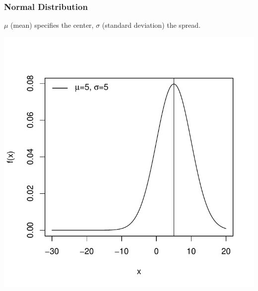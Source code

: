 \documentclass[slides]{beamer}
\begin{document}
\begin{frame}
\frametitle{Normal Distribution}
$\mu$ (mean) specifies the center, $\sigma$ (standard deviation) the spread.
\begin{center}
\includegraphics{figure/lec02-003}
\end{center}
\end{frame}
\end{document}
